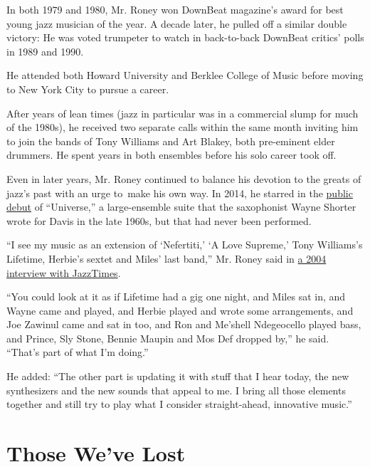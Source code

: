 In both 1979 and 1980, Mr. Roney won DownBeat magazine's award for best
young jazz musician of the year. A decade later, he pulled off a similar
double victory: He was voted trumpeter to watch in back-to-back DownBeat
critics' polls in 1989 and 1990.

He attended both Howard University and Berklee College of Music before
moving to New York City to pursue a career.

After years of lean times (jazz in particular was in a commercial slump
for much of the 1980s), he received two separate calls within the same
month inviting him to join the bands of Tony Williams and Art Blakey,
both pre-eminent elder drummers. He spent years in both ensembles before
his solo career took off.

Even in later years, Mr. Roney continued to balance his devotion to the
greats of jazz's past with an urge to~make his own way. In 2014, he
starred in the
\href{https://www.npr.org/2014/10/16/356653950/to-miles-from-wayne}{public
debut} of ``Universe,'' a large-ensemble suite that the saxophonist
Wayne Shorter wrote for Davis in the late 1960s, but that had never been
performed.

``I see my music as an extension of `Nefertiti,' `A Love Supreme,' Tony
Williams's Lifetime, Herbie's sextet and Miles' last band,'' Mr. Roney
said in
\href{https://jazztimes.com/features/profiles/wallace-roney-the-man-with-the-golden-horn/}{a
2004 interview with JazzTimes}.

``You could look at it as if Lifetime had a gig one night, and Miles sat
in, and Wayne came and played, and Herbie played and wrote some
arrangements, and Joe Zawinul came and sat in too, and Ron and Me'shell
Ndegeocello played bass, and Prince, Sly Stone, Bennie Maupin and Mos
Def dropped by,'' he said. ``That's part of what I'm doing.''

He added: ``The other part is updating it with stuff that I hear today,
the new synthesizers and the new sounds that appeal to me. I bring all
those elements together and still try to play what I consider
straight-ahead, innovative music.''

\href{https://www.nytimes3xbfgragh.onion/interactive/2020/obituaries/people-died-coronavirus-obituaries.html?action=click\&pgtype=Article\&state=default\&region=BELOW_MAIN_CONTENT\&context=covid_obits_promo}{}

\hypertarget{those-weve-lost}{%
\section{Those We've Lost}\label{those-weve-lost}}

